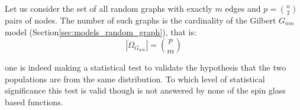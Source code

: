 Let us consider the set of all random graphs with exactly $m$ edges and $p=\binom{n}{2}$ pairs of nodes.
The number of such graphs is the cardinality of the Gilbert $G_{nm}$ model (Section\ref{sec:models_random_graph}), that is:
\begin{equation}
| \Omega_{G_{nm}} |  = \binom{p}{m}
\end{equation}

one is indeed making a statistical test to validate the hypothesis that the two populations are from the same distribution. To which level of statistical significance this test is valid though is not answered by none of the spin glass based functions.


\begin{equation}
\end{equation}
